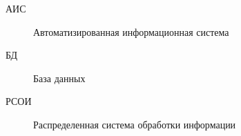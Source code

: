 \Abbreviations %
\begin{description}
\item[АИС] Автоматизированная информационная система
\item [БД] База данных
\item [РСОИ] Распределенная система обработки информации
\end{description}

